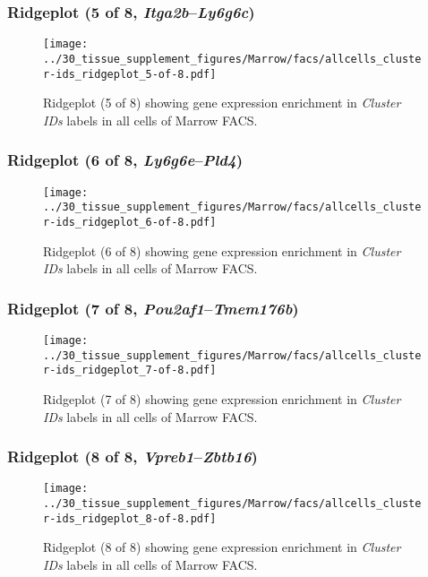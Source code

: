 \clearpage

\subsubsection{Ridgeplot (5 of 8, \emph{Itga2b}--\emph{Ly6g6c})}
\begin{figure}[h]
\centering
\texttt{[image: ../30\_tissue\_supplement\_figures/Marrow/facs/allcells\_cluster-ids\_ridgeplot\_5-of-8.pdf]}

\caption{ Ridgeplot (5 of 8)  showing gene expression enrichment in \emph{Cluster IDs} labels in all cells of Marrow FACS. }
\end{figure}


\clearpage

\subsubsection{Ridgeplot (6 of 8, \emph{Ly6g6e}--\emph{Pld4})}
\begin{figure}[h]
\centering
\texttt{[image: ../30\_tissue\_supplement\_figures/Marrow/facs/allcells\_cluster-ids\_ridgeplot\_6-of-8.pdf]}

\caption{ Ridgeplot (6 of 8)  showing gene expression enrichment in \emph{Cluster IDs} labels in all cells of Marrow FACS. }
\end{figure}


\clearpage

\subsubsection{Ridgeplot (7 of 8, \emph{Pou2af1}--\emph{Tmem176b})}
\begin{figure}[h]
\centering
\texttt{[image: ../30\_tissue\_supplement\_figures/Marrow/facs/allcells\_cluster-ids\_ridgeplot\_7-of-8.pdf]}

\caption{ Ridgeplot (7 of 8)  showing gene expression enrichment in \emph{Cluster IDs} labels in all cells of Marrow FACS. }
\end{figure}


\clearpage

\subsubsection{Ridgeplot (8 of 8, \emph{Vpreb1}--\emph{Zbtb16})}
\begin{figure}[h]
\centering
\texttt{[image: ../30\_tissue\_supplement\_figures/Marrow/facs/allcells\_cluster-ids\_ridgeplot\_8-of-8.pdf]}

\caption{ Ridgeplot (8 of 8)  showing gene expression enrichment in \emph{Cluster IDs} labels in all cells of Marrow FACS. }
\end{figure}


